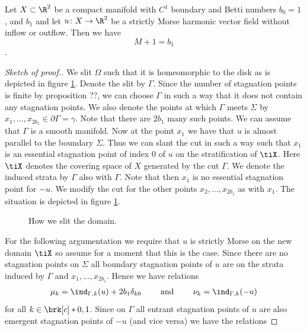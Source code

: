 \begin{proposition}
  Let $X\subset\R^2$ be a compact manifold with $C^1$ boundary and Betti numbers $b_0=1$, and $b_1$
  and let $u\colon X\to\R^2$ be 
  a strictly Morse harmonic vector field without inflow or outflow.
  Then we have $$M+1=b_1$$.
\end{proposition}
\begin{proof}[Sketch of proof.]
  We slit $\Omega$ such that it is homeomorphic to the disk as is 
  depicted in figure \ref{fi:n2_hvf_slitDomain}.
  Denote the slit by $\Gamma$. Since the number of stagnation points is 
  finite by proposition ??, we can choose $\Gamma$ in such a way that it does not contain
  any stagnation points.
  We also denote the points at which
  $\Gamma$ meets $\Sigma$ by $x_1,\dots,x_{2b_1}\in\partial\Gamma=\gamma$.
  Note that there are $2b_1$ many such points.
  We can assume that $\Gamma$ is a smooth manifold. Now at the point $x_1$
  we have that $u$ is almost parallel to the boundary $\Sigma$. Thus we can slant
  the cut in such a way such that $x_1$ is an essential stagnation point of index $0$ of $u$ on the stratification
  of $\tiX$. Here $\tiX$ denotes the covering space of $X$ generated by the cut $\Gamma$.
  We denote the induced strata by $\Gamma$ also with $\Gamma$. Note that then $x_1$ is no
  essential stagnation point for $-u$.
  We modify the cut for the other points $x_2,\dots,x_{2b_1}$ as with $x_1$.
  The situation is depicted in figure \ref{fi:n2_hvf_slitDomain}.
  \begin{figure}
    \centering
    
    \caption{How we slit the domain.}
    \label{fi:n2_hvf_slitDomain}
  \end{figure}
  For the following argumentation we require that $u$ is strictly Morse on the new domain $\tiX$ 
  so assume for a moment that this is the case.
  Since there are no stagnation points on $\Sigma$ all boundary stagnation points of $u$ are on
  the strata induced by $\Gamma$ and $x_1,\dots,x_{2b_1}$. Hence we have relations
  \begin{align}
    \mu_k=\ind_{\Gamma,k}(u)+2b_1\delta_{k0} \qquad\text{ and }\qquad
    \nu_k=\ind_{\Gamma,k}(-u)\label{eq:n2_hvf_noInflowNoOutflow_relationsMuIndex}
  \end{align}
  for all $k\in\brk[c]*{0,1}$.
  Since on $\Gamma$ all entrant stagnation points of $u$ are also emergent
  stagnation points of $-u$ (and vice versa) we have the relations

\end{proof}
